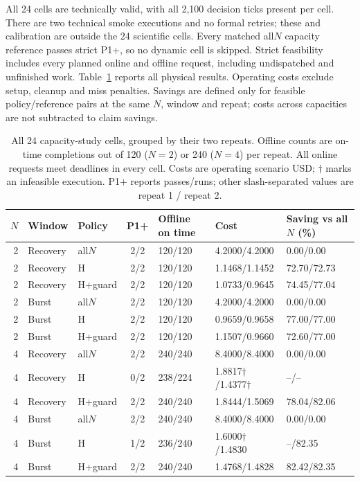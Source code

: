 All 24 cells are technically valid, with all 2,100 decision ticks present
per cell. There are two technical smoke executions and no formal retries;
these and calibration are outside the 24 scientific cells. Every matched
all$N$ capacity reference passes strict P1+, so no dynamic cell is skipped.
Strict feasibility includes every planned online and offline request,
including undispatched and unfinished work. Table~\ref{tab:capacity-physical}
reports all physical results. Operating costs exclude setup, cleanup and
miss penalties. Savings are defined only for feasible policy/reference
pairs at the same $N$, window and repeat; costs across capacities are not
subtracted to claim savings.

\begin{table}[t]
\centering\small
\caption{All 24 capacity-study cells, grouped by their two repeats.
Offline counts are on-time completions out of 120 ($N=2$) or 240 ($N=4$)
per repeat. All online requests meet deadlines in every cell.
Costs are operating scenario USD; $\dagger$ marks an infeasible execution.
P1+ reports passes/runs; other slash-separated values are repeat 1 / repeat 2.}
\label{tab:capacity-physical}
\setlength{\tabcolsep}{3pt}
\begin{tabular*}{\textwidth}{@{\extracolsep{\fill}}rllclll@{}}
\toprule
$N$ & Window & Policy & P1+ & Offline on time & Cost & Saving vs all$N$ (\%)\\
\midrule
2 & Recovery & all$N$ & 2/2 & 120/120 & 4.2000/4.2000 & 0.00/0.00 \\
2 & Recovery & H & 2/2 & 120/120 & 1.1468/1.1452 & 72.70/72.73 \\
2 & Recovery & H+guard & 2/2 & 120/120 & 1.0733/0.9645 & 74.45/77.04 \\
\midrule
2 & Burst & all$N$ & 2/2 & 120/120 & 4.2000/4.2000 & 0.00/0.00 \\
2 & Burst & H & 2/2 & 120/120 & 0.9659/0.9658 & 77.00/77.00 \\
2 & Burst & H+guard & 2/2 & 120/120 & 1.1507/0.9660 & 72.60/77.00 \\
\midrule
4 & Recovery & all$N$ & 2/2 & 240/240 & 8.4000/8.4000 & 0.00/0.00 \\
4 & Recovery & H & 0/2 & 238/224 & 1.8817$\dagger$/1.4377$\dagger$ & --/-- \\
4 & Recovery & H+guard & 2/2 & 240/240 & 1.8444/1.5069 & 78.04/82.06 \\
\midrule
4 & Burst & all$N$ & 2/2 & 240/240 & 8.4000/8.4000 & 0.00/0.00 \\
4 & Burst & H & 1/2 & 236/240 & 1.6000$\dagger$/1.4830 & --/82.35 \\
4 & Burst & H+guard & 2/2 & 240/240 & 1.4768/1.4828 & 82.42/82.35 \\
\bottomrule
\end{tabular*}
\end{table}

